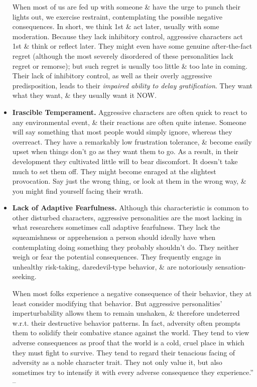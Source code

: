 \documentclass{article}
\numberwithin{equation}{section}
\begin{document}
\begin{itemize}
    When most of us are fed up with someone \& have the urge to punch their lights out, we exercise restraint, contemplating the possible negative consequences. In short, we think 1st \& act later, usually with some moderation. Because they lack inhibitory control, aggressive characters act 1st \& think or reflect later. They might even have some genuine after-the-fact regret (although the most severely disordered of these personalities lack regret or remorse); but such regret is usually too little \& too late in coming. Their lack of inhibitory control, as well as their overly aggressive predisposition, leads to their \textit{impaired ability to delay gratification}. They want what they want, \& they usually want it NOW.
    \item \textbf{Irascible Temperament.} Aggressive characters are often quick to react to any environmental event, \& their reactions are often quite intense. Someone will say something that most people would simply ignore, whereas they overreact. They have a remarkably low frustration tolerance, \& become easily upset when things don't go as they want them to go. As a result, in their development they cultivated little will to bear discomfort. It doesn't take much to set them off. They might become enraged at the slightest provocation. Say just the wrong thing, or look at them in the wrong way, \& you might find yourself facing their wrath.
    \item \textbf{Lack of Adaptive Fearfulness.} Although this characteristic is common to other disturbed characters, aggressive personalities are the most lacking in what researchers sometimes call adaptive fearfulness. They lack the squeamishness or apprehension a person should ideally have when contemplating doing something they probably shouldn't do. They neither weigh or fear the potential consequences. They frequently engage in unhealthy risk-taking, daredevil-type behavior, \& are notoriously sensation-seeking.
    
    When most folks experience a negative consequence of their behavior, they at least consider modifying that behavior. But aggressive personalities' imperturbability allows them to remain unshaken, \& therefore undeterred w.r.t. their destructive behavior patterns. In fact, adversity often prompts them to solidify their combative stance against the world. They tend to view adverse consequences as proof that the world is a cold, cruel place in which they must fight to survive. They tend to regard their tenacious facing of adversity as a noble character trait. They not only value it, but also sometimes try to intensify it with every adverse consequence they experience.'' -- \cite[pp. 93--99]{Simon2011}
\end{itemize}
\end{document}
